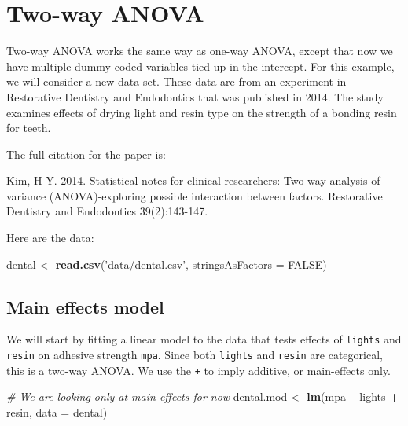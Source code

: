\documentclass[
]{book}
\newenvironment{Shaded}{\begin{snugshade}}{\end{snugshade}}
\newcommand{\CommentTok}[1]{\textcolor[rgb]{0.56,0.35,0.01}{\textit{#1}}}
\newcommand{\DataTypeTok}[1]{\textcolor[rgb]{0.13,0.29,0.53}{#1}}
\newcommand{\KeywordTok}[1]{\textcolor[rgb]{0.13,0.29,0.53}{\textbf{#1}}}
\newcommand{\NormalTok}[1]{#1}
\newcommand{\OperatorTok}[1]{\textcolor[rgb]{0.81,0.36,0.00}{\textbf{#1}}}
\newcommand{\OtherTok}[1]{\textcolor[rgb]{0.56,0.35,0.01}{#1}}
\newcommand{\StringTok}[1]{\textcolor[rgb]{0.31,0.60,0.02}{#1}}
\begin{document}
\hypertarget{two-way-anova}{%
\section{Two-way ANOVA}\label{two-way-anova}}

Two-way ANOVA works the same way as one-way ANOVA, except that now we have multiple dummy-coded variables tied up in the intercept. For this example, we will consider a new data set. These data are from an experiment in Restorative Dentistry and Endodontics that was published in 2014. The study examines effects of drying light and resin type on the strength of a bonding resin for teeth.

The full citation for the paper is:

Kim, H-Y. 2014. Statistical notes for clinical researchers: Two-way analysis of variance (ANOVA)-exploring possible interaction between factors. Restorative Dentistry and Endodontics 39(2):143-147.

Here are the data:

\begin{Shaded}
\begin{Highlighting}[]
\NormalTok{dental <-}\StringTok{ }\KeywordTok{read.csv}\NormalTok{(}\StringTok{'data/dental.csv'}\NormalTok{, }\DataTypeTok{stringsAsFactors =} \OtherTok{FALSE}\NormalTok{)}
\end{Highlighting}
\end{Shaded}

\hypertarget{main-effects-10}{%
\subsection{Main effects model}\label{main-effects-10}}

We will start by fitting a linear model to the data that tests effects of \texttt{lights} and \texttt{resin} on adhesive strength \texttt{mpa}. Since both \texttt{lights} and \texttt{resin} are categorical, this is a two-way ANOVA. We use the \texttt{+} to imply additive, or main-effects only.

\begin{Shaded}
\begin{Highlighting}[]
\CommentTok{# We are looking only at main effects for now}
\NormalTok{dental.mod <-}\StringTok{ }\KeywordTok{lm}\NormalTok{(mpa }\OperatorTok{~}\StringTok{ }\NormalTok{lights }\OperatorTok{+}\StringTok{ }\NormalTok{resin, }\DataTypeTok{data =}\NormalTok{ dental)}
\end{Highlighting}
\end{Shaded}
\end{document}
